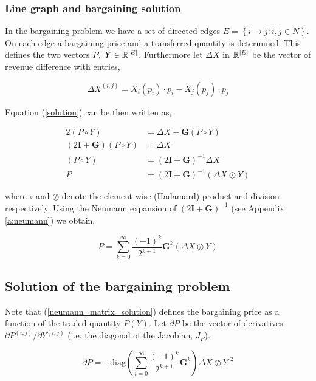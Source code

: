 \documentclass[american]{scrartcl}
\newcommand{\R}{\mathbb{R}}
\newcommand{\matr}[1]{\bm{#1}}
\newcommand{\set}[1]{\left\{#1\right\}}
\newcommand{\diag}{\text{diag}}
\DeclarePairedDelimiter\abs{\lvert}{\rvert}%
\begin{document}
\subsubsection{Line graph and bargaining solution}

In the bargaining problem we have a set of directed edges $E = \set{i \to j: i, j \in N}$. On each edge a bargaining price and a transferred quantity is determined. This defines the two vectors $P, \ Y \in \R^{\abs{E}}$. Furthermore let $\Delta X$ in $\R^{\abs{E}}$ be the vector of revenue difference with entries,

\begin{equation}
	\Delta X^{(i, j)} = X_i(p_i) \cdot p_i - X_{j}(p_j) \cdot p_j
\end{equation}

Equation (\ref{solution}) can be then written as,

\begin{equation} \label{matrix_solution}
	\begin{split}
		2(P \circ Y) &= \Delta X - \matr{G} \left( P \circ Y \right) \\
		(2\matr{I} + \matr{G}) (P \circ Y) &= \Delta X \\
		(P \circ Y) &= (2\matr{I} + \matr{G})^{-1} \Delta X \\
		P &= (2\matr{I} + \matr{G})^{-1} (\Delta X \oslash Y)
	\end{split}
\end{equation}

where $\circ$ and $\oslash$ denote the element-wise (Hadamard) product and division respectively. Using the Neumann expansion of $(2\matr{I} + \matr{G})^{-1}$ (see Appendix \ref{a:neumann}) we obtain,

\begin{equation} \label{neumann_matrix_solution}
	P = \sum^{\infty}_{k=0}\frac{(-1)^k}{2^{k+1}} \matr{G}^k (\Delta X \oslash Y)
\end{equation}

\subsection{Solution of the bargaining problem}

Note that (\ref{neumann_matrix_solution}) defines the bargaining price as a function of the traded quantity $P(Y)$. Let $\partial P$ be the vector of derivatives $\partial P^{(i, j)} / \partial Y^{(i, j)}$ (i.e. the diagonal of the Jacobian, $J_P$).

\begin{equation}
	\partial P = - \diag\left(\sum^\infty_{i=0} \frac{(-1)^k}{2^{k+1}} \matr{G}^k\right) \Delta X \oslash Y^{\circ 2}
\end{equation}
\end{document}
